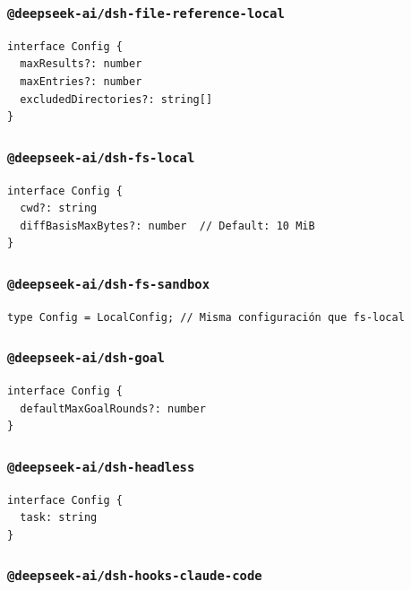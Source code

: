 \documentclass[11pt,a4paper]{article}
\begin{document}
\subsubsection*{\texttt{@deepseek-ai/dsh-file-reference-local}}


\begin{lstlisting}
interface Config {
  maxResults?: number
  maxEntries?: number
  excludedDirectories?: string[]
}
\end{lstlisting}


\subsubsection*{\texttt{@deepseek-ai/dsh-fs-local}}


\begin{lstlisting}
interface Config {
  cwd?: string
  diffBasisMaxBytes?: number  // Default: 10 MiB
}
\end{lstlisting}


\subsubsection*{\texttt{@deepseek-ai/dsh-fs-sandbox}}


\begin{lstlisting}
type Config = LocalConfig; // Misma configuración que fs-local
\end{lstlisting}


\subsubsection*{\texttt{@deepseek-ai/dsh-goal}}


\begin{lstlisting}
interface Config {
  defaultMaxGoalRounds?: number
}
\end{lstlisting}


\subsubsection*{\texttt{@deepseek-ai/dsh-headless}}


\begin{lstlisting}
interface Config {
  task: string
}
\end{lstlisting}


\subsubsection*{\texttt{@deepseek-ai/dsh-hooks-claude-code}}
\end{document}
